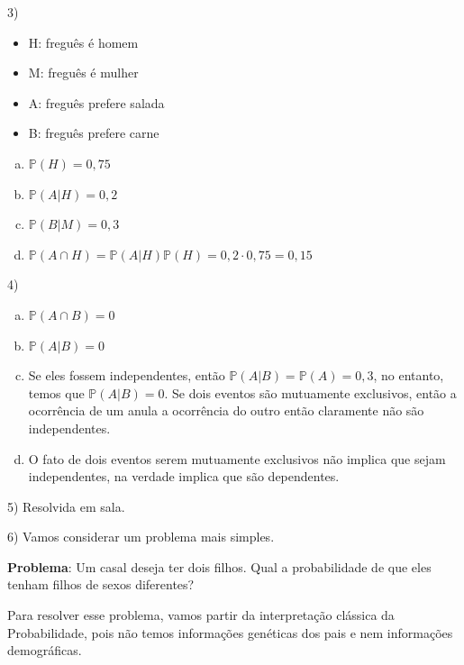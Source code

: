 \documentclass[12pt]{article}
\begin{document}
\vspace{5px}

3) 
\begin{itemize}
    \item H: freguês é homem
    \item M: freguês é mulher
    \item A: freguês prefere salada
    \item B: freguês prefere carne
\end{itemize}


\begin{enumerate}[a)] %
    \item$ \mathds{P}(H) = 0,75$
    \item $\mathds{P}(A|H) = 0,2 $
    \item $\mathds{P}(B|M) = 0,3$
    \item $\mathds{P}(A \cap H) = \mathds{P}(A|H)\mathds{P}(H) = 0,2 \cdot 0,75 = 0,15 $
\end{enumerate}

\vspace{5px}

4) 

\begin{enumerate}[a)] %
    \item  $\mathds{P}(A \cap B) = 0$
    \item  $\mathds{P}(A | B) = 0$
    \item Se eles fossem independentes, então $\mathds{P}(A | B) = \mathds{P}(A) = 0,3$, no entanto, temos que $\mathds{P}(A | B) = 0$. Se dois eventos 
    são mutuamente exclusivos, então a ocorrência de um anula a ocorrência do outro então claramente não são independentes. 
    \item O fato de dois eventos serem mutuamente exclusivos não implica que sejam independentes, na verdade implica que são dependentes. 
\end{enumerate}

\vspace{5px}

5) Resolvida em sala. 

6) Vamos considerar um problema mais simples. 

\textbf{Problema}: Um casal deseja ter dois filhos. Qual a probabilidade de que eles tenham filhos de sexos diferentes?

Para resolver esse problema, vamos partir da interpretação clássica da Probabilidade, pois não temos informações genéticas dos pais e nem informações demográficas. 
\end{document}
